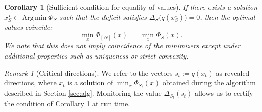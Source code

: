\documentclass[accepted]{uai2026}
\theoremstyle{plain}
\newtheorem{corollary}[theorem]{Corollary}
\theoremstyle{definition}
\theoremstyle{remark}
\newtheorem{remark}[theorem]{Remark}
\newcommand{\R}{\mathbb{R}}
\newcommand{\ip}[2]{\left\langle #1 ,\, #2 \right\rangle}
\DeclareMathOperator*{\Argmin}{Arg\,min}
\begin{document}
\begin{corollary}[Sufficient condition for equality of values]\label{cor:igualdad-valores}
If there exists a solution $x_S^\star\in\Argmin\Phi_S$ such that the deficit satisfies $\Delta_S\big(q(x_S^\star)\big)=0$, then the optimal values coincide:
\[
\min_x \Phi_{[N]}(x)\ =\ \min_x \Phi_S(x).
\]
We note that this does not imply coincidence of the minimizers except under additional properties such as uniqueness or strict convexity.
\end{corollary}

\begin{remark}[Critical directions]
We refer to the vectors $s_t:=q(x_t)$ as revealed directions, where $x_t$ is a solution of $\min_x \Phi_{S_t}(x)$ obtained during the algorithm described in Section \ref{sec:alg}. Monitoring the value $\Delta_{S_t}(s_t)$ allows us to certify the condition of Corollary \ref{cor:igualdad-valores} at run time.
\end{remark}





\end{document}
